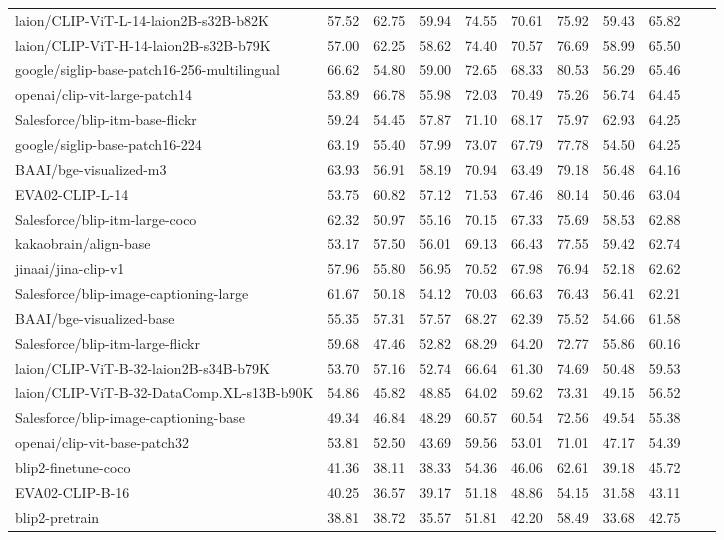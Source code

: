 \begin{table*}
{\begin{tabular}{lcccccccccc}
laion/CLIP-ViT-L-14-laion2B-s32B-b82K &57.52 &62.75 &59.94 &74.55 &70.61 &75.92 &59.43 &65.82 \\
laion/CLIP-ViT-H-14-laion2B-s32B-b79K &57.00 &62.25 &58.62 &74.40 &70.57 &76.69 &58.99 &65.50 \\
google/siglip-base-patch16-256-multilingual &66.62 &54.80 &59.00 &72.65 &68.33 &80.53 &56.29 &65.46 \\
openai/clip-vit-large-patch14 &53.89 &66.78 &55.98 &72.03 &70.49 &75.26 &56.74 &64.45 \\
Salesforce/blip-itm-base-flickr &59.24 &54.45 &57.87 &71.10 &68.17 &75.97 &62.93 &64.25 \\
google/siglip-base-patch16-224 &63.19 &55.40 &57.99 &73.07 &67.79 &77.78 &54.50 &64.25 \\
BAAI/bge-visualized-m3 &63.93 &56.91 &58.19 &70.94 &63.49 &79.18 &56.48 &64.16 \\
EVA02-CLIP-L-14 &53.75 &60.82 &57.12 &71.53 &67.46 &80.14 &50.46 &63.04 \\
Salesforce/blip-itm-large-coco &62.32 &50.97 &55.16 &70.15 &67.33 &75.69 &58.53 &62.88 \\
kakaobrain/align-base &53.17 &57.50 &56.01 &69.13 &66.43 &77.55 &59.42 &62.74 \\
jinaai/jina-clip-v1 &57.96 &55.80 &56.95 &70.52 &67.98 &76.94 &52.18 &62.62 \\
Salesforce/blip-image-captioning-large &61.67 &50.18 &54.12 &70.03 &66.63 &76.43 &56.41 &62.21 \\
BAAI/bge-visualized-base &55.35 &57.31 &57.57 &68.27 &62.39 &75.52 &54.66 &61.58 \\
Salesforce/blip-itm-large-flickr &59.68 &47.46 &52.82 &68.29 &64.20 &72.77 &55.86 &60.16 \\
laion/CLIP-ViT-B-32-laion2B-s34B-b79K &53.70 &57.16 &52.74 &66.64 &61.30 &74.69 &50.48 &59.53 \\
laion/CLIP-ViT-B-32-DataComp.XL-s13B-b90K &54.86 &45.82 &48.85 &64.02 &59.62 &73.31 &49.15 &56.52 \\
Salesforce/blip-image-captioning-base &49.34 &46.84 &48.29 &60.57 &60.54 &72.56 &49.54 &55.38 \\
openai/clip-vit-base-patch32 &53.81 &52.50 &43.69 &59.56 &53.01 &71.01 &47.17 &54.39 \\
blip2-finetune-coco &41.36 &38.11 &38.33 &54.36 &46.06 &62.61 &39.18 &45.72 \\
EVA02-CLIP-B-16 &40.25 &36.57 &39.17 &51.18 &48.86 &54.15 &31.58 &43.11 \\
blip2-pretrain &38.81 &38.72 &35.57 &51.81 &42.20 &58.49 &33.68 &42.75 \\

\end{tabular}}
\end{table*}
